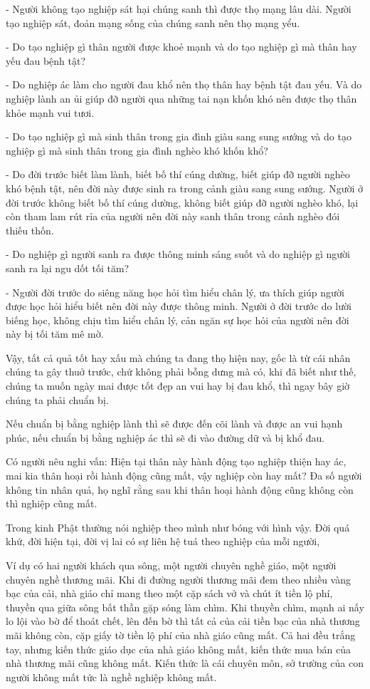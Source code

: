 \documentclass[
  12pt,
  oneside]{book}
\begin{document}
- Người không tạo nghiệp sát hại chúng sanh thì được thọ mạng lâu dài. Người tạo nghiệp sát, đoản mạng sống của chúng sanh nên thọ mạng yểu.

- Do tạo nghiệp gì thân người được khoẻ mạnh và do tạo nghiệp gì mà thân hay yếu đau bệnh tật?

- Do nghiệp ác làm cho người đau khổ nên thọ thân hay bệnh tật đau yếu. Và do nghiệp lành an ủi giúp đỡ người qua những tai nạn khốn khó nên được thọ thân khỏe mạnh vui tươi.

- Do tạo nghiệp gì mà sinh thân trong gia đình giàu sang sung sướng và do tạo nghiệp gì mà sinh thân trong gia đình nghèo khó khốn khổ?

- Do đời trước biết làm lành, biết bố thí cúng dường, biết giúp đỡ người nghèo khó bệnh tật, nên đời này được sinh ra trong cảnh giàu sang sung sướng. Người ở đời trước không biết bố thí cúng dường, không biết giúp đỡ người nghèo khó, lại còn tham lam rút rỉa của người nên đời này sanh thân trong cảnh nghèo đói thiếu thốn.

- Do nghiệp gì người sanh ra được thông minh sáng suốt và do nghiệp gì người sanh ra lại ngu dốt tối tăm?

- Người đời trước do siêng năng học hỏi tìm hiểu chân lý, ưa thích giúp người được học hỏi hiểu biết nên đời này được thông minh. Người ở đời trước do lười biếng học, không chịu tìm hiểu chân lý, cản ngăn sự học hỏi của người nên đời này bị tối tăm mê mờ.

Vậy, tất cả quả tốt hay xấu mà chúng ta đang thọ hiện nay, gốc là từ cái nhân chúng ta gây thuở trước, chứ không phải bỗng dưng mà có, khi đã biết như thế, chúng ta muốn ngày mai được tốt đẹp an vui hay bị đau khổ, thì ngay bây giờ chúng ta phải chuẩn bị.

Nếu chuẩn bị bằng nghiệp lành thì sẽ được đến cõi lành và được an vui hạnh phúc, nếu chuẩn bị bằng nghiệp ác thì sẽ đi vào đường dữ và bị khổ đau.

Có người nêu nghi vấn: Hiện tại thân này hành động tạo nghiệp thiện hay ác, mai kia thân hoại rồi hành động cũng mất, vậy nghiệp còn hay mất? Đa số người không tin nhân quả, họ nghĩ rằng sau khi thân hoại hành động cũng không còn thì nghiệp cũng mất.

Trong kinh Phật thường nói nghiệp theo mình như bóng với hình vậy. Đời quá khứ, đời hiện tại, đời vị lai có sự liên hệ tuá theo nghiệp của mỗi người,

Ví dụ có hai người khách qua sông, một người chuyên nghề giáo, một người chuyên nghề thương mãi. Khi đi đường người thương mãi đem theo nhiều vàng bạc của cải, nhà giáo chỉ mang theo một cặp sách vở và chút ít tiền lộ phí, thuyền qua giữa sông bất thần gặp sóng làm chìm. Khi thuyền chìm, mạnh ai nấy lo lội vào bờ để thoát chết, lên đến bờ thì tất cả của cải tiền bạc của nhà thương mãi không còn, cặp giấy tờ tiền lộ phí của nhà giáo cũng mất. Cả hai đều trắng tay, nhưng kiến thức giáo dục của nhà giáo không mất, kiến thức mua bán của nhà thương mãi cũng không mất. Kiến thức là cái chuyên môn, sở trường của con người không mất tức là nghề nghiệp không mất.
\end{document}
